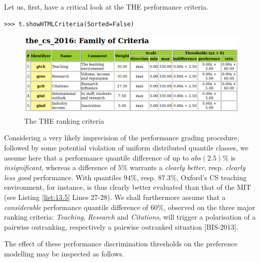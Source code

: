 Let us, first, have a critical look at the THE performance criteria.

\begin{lstlisting}
>>> t.showHTMLCriteria(Sorted=False)
\end{lstlisting}

\begin{figure}[h]
\includegraphics[width=12cm]{Figures/the_cs_2016Criteria.png}
\caption{The THE ranking criteria}
\label{fig:13.1}       %
\end{figure}

Considering a very likely imprecision of the performance grading procedure, followed by some potential violation of uniform distributed quantile classes, we assume here that a performance quantile difference of up to $abs(2.5)\%$ is \emph{insignificant}, whereas a difference of $5\%$ warrants a \emph{clearly better}, resp. \emph{clearly less good} performance. With quantiles $94\%$, resp. $87.3\%$, Oxford's CS teaching environment, for instance, is thus clearly better evaluated than that of the MIT (see Listing \ref{list:13.5} Lines 27-28). We shall furthermore assume that a \emph{considerable} performance quantile difference of $60\%$, observed on the three major ranking criteria: \emph{Teaching}, \emph{Research} and \emph{Citations}, will trigger a polarisation of a pairwise outranking, respectively a pairwise outranked situation [BIS-2013].

The effect of these performance discrimination thresholds on the preference modelling may be inspected as follows.


